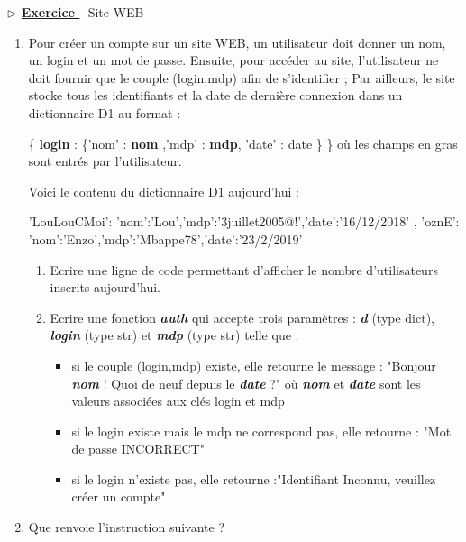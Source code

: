 \documentclass[12pt,french]{article}
\newcounter{npb}
\newcommand{\exo}{
    \stepcounter{npb}
    {\textbf{$\triangleright$ \underline{Exercice \arabic{npb} }}}
}
\begin{document}
\exo - Site WEB
\begin{enumerate}
	\item Pour créer un compte sur un site WEB, un utilisateur doit donner un nom, un login et un mot de passe. Ensuite, pour accéder au site, l'utilisateur ne doit fournir que le couple (login,mdp) afin de s’identifier ; Par ailleurs, le site stocke tous
	les identifiants et la date de dernière connexion dans un dictionnaire D1 au format :
	\begin{center}
	\{ \textbf{login} : \{’nom’ : \textbf{nom} ,’mdp’ : \textbf{mdp}, ’date’ : date \} \} où les champs en gras sont entrés par l’utilisateur.
	\end{center}
	Voici le contenu du dictionnaire D1 aujourd’hui :\\
	\begin{tcolorbox}[enhanced,colback=blue!5!white,colframe=blue!75!black]	
	\begin{pyverbatim}
	{'LouLouCMoi': {'nom':'Lou','mdp':'3juillet2005@!','date':'16/12/2018' },
	'oznE': {'nom':'Enzo','mdp':'Mbappe78','date':'23/2/2019'}}
	\end{pyverbatim}
	\end{tcolorbox}	
\begin{enumerate}
	\item Ecrire une ligne de code permettant d’afficher le nombre d’utilisateurs inscrits aujourd’hui.
	\item Ecrire une fonction \textbf{\textsl{auth}} qui accepte trois paramètres : \textbf{\textsl{d}} (type dict), \textbf{\textsl{login}} (type str) et \textbf{\textsl{mdp}} (type str) telle que : 
	\begin{itemize}
		\item si le couple (login,mdp) existe, elle retourne le message : "Bonjour \textbf{\textsl{nom}} ! Quoi de neuf depuis le \textbf{\textsl{date}} ?" où
	\textbf{\textsl{nom}} et \textbf{\textsl{date}} sont les valeurs associées aux clés login et mdp
	\item  si le login existe mais le mdp ne correspond pas, elle retourne : "Mot de passe INCORRECT"
	\item si le login n’existe pas, elle retourne :"Identifiant Inconnu, veuillez créer un compte"
	\end{itemize}
	\end{enumerate}
\item Que renvoie l’instruction suivante ?
\begin{tcolorbox}[enhanced,colback=blue!5!white,colframe=blue!75!black]	
\begin{pyverbatim}

\end{pyverbatim}
\end{tcolorbox}
\end{enumerate}
\end{document}
